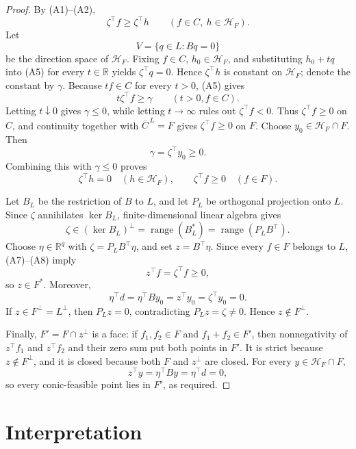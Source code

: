 \documentclass{article}
\begin{document}
\begin{proof}
By (A1)--(A2),
\[
 \zeta^{\top}f\geq\zeta^{\top}h
 \qquad(f\in C,\ h\in\mathcal H_F).                                    \tag{A5}
\]
Let
\[
 V=\{q\in L:Bq=0\}
\]
be the direction space of \(\mathcal H_F\).  Fixing \(f\in C\), \(h_0\in\mathcal H_F\), and substituting \(h_0+tq\) into (A5) for every \(t\in\mathbb R\) yields \(\zeta^{\top}q=0\).  Hence \(\zeta^{\top}h\) is constant on \(\mathcal H_F\); denote the constant by \(\gamma\).  Because \(tf\in C\) for every \(t>0\), (A5) gives
\[
 t\zeta^{\top}f\geq\gamma\qquad(t>0,f\in C).                          \tag{A6}
\]
Letting \(t\downarrow0\) gives \(\gamma\leq0\), while letting \(t\to\infty\) rules out \(\zeta^{\top}f<0\).  Thus \(\zeta^{\top}f\geq0\) on \(C\), and continuity together with \(\overline C^{\,L}=F\) gives \(\zeta^{\top}f\geq0\) on \(F\).  Choose \(y_0\in\mathcal H_F\cap F\).  Then
\[
 \gamma=\zeta^{\top}y_0\geq0.
\]
Combining this with \(\gamma\leq0\) proves
\[
 \zeta^{\top}h=0\quad(h\in\mathcal H_F),
 \qquad \zeta^{\top}f\geq0\quad(f\in F).                              \tag{A7}
\]

Let \(B_L\) be the restriction of \(B\) to \(L\), and let \(P_L\) be orthogonal projection onto \(L\).  Since \(\zeta\) annihilates \(\ker B_L\), finite-dimensional linear algebra gives
\[
 \zeta\in(\ker B_L)^\perp
       =\operatorname{range}(B_L^*)
       =\operatorname{range}(P_LB^{\top}).                              \tag{A8}
\]
Choose \(\eta\in\mathbb R^q\) with \(\zeta=P_LB^{\top}\eta\), and set \(z=B^{\top}\eta\).  Since every \(f\in F\) belongs to \(L\), (A7)--(A8) imply
\[
 z^{\top}f=\zeta^{\top}f\geq0,
\]
so \(z\in F^*\).  Moreover,
\[
 \eta^{\top}d
 =\eta^{\top}By_0
 =z^{\top}y_0
 =\zeta^{\top}y_0
 =0.                                                                    \tag{A9}
\]
If \(z\in F^\perp=L^\perp\), then \(P_Lz=0\), contradicting \(P_Lz=\zeta\ne0\).  Hence \(z\notin F^\perp\).

Finally, \(F'=F\cap z^\perp\) is a face: if \(f_1,f_2\in F\) and \(f_1+f_2\in F'\), then nonnegativity of \(z^{\top}f_1\) and \(z^{\top}f_2\) and their zero sum put both points in \(F'\).  It is strict because \(z\notin F^\perp\), and it is closed because both \(F\) and \(z^\perp\) are closed.  For every \(y\in\mathcal H_F\cap F\),
\[
 z^{\top}y=\eta^{\top}By=\eta^{\top}d=0,
\]
so every conic-feasible point lies in \(F'\), as required.
\end{proof}

\section{Interpretation}
\end{document}
